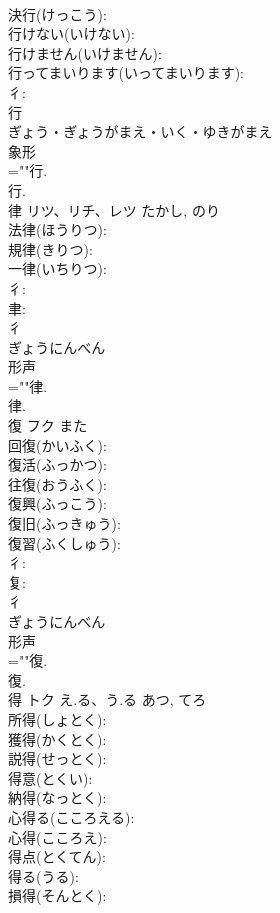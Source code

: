 \documentclass[8pt]{extreport}
\begin{document}
\begin{CJK}{UTF8}{min}
\\	決行(けっこう): 
\\	行けない(いけない): 
\\	行けません(いけません): 
\\	行ってまいります(いってまいります): 
\\	彳: 
\\	行	
\\	ぎょう・ぎょうがまえ・いく・ゆきがまえ	
\\	象形 
\\	=""行.
\\	行.
\\	律	リツ、リチ、レツ		たかし, のり	
\\	法律(ほうりつ): 
\\	規律(きりつ): 
\\	一律(いちりつ): 
\\	彳: 
\\	聿: 
\\	彳	
\\	ぎょうにんべん	
\\	形声 
\\	=""律.
\\	律.
\\	復	フク	また		
\\	回復(かいふく): 
\\	復活(ふっかつ): 
\\	往復(おうふく): 
\\	復興(ふっこう): 
\\	復旧(ふっきゅう): 
\\	復習(ふくしゅう): 
\\	彳: 
\\	复: 
\\	彳	
\\	ぎょうにんべん	
\\	形声 
\\	=""復.
\\	復.
\\	得	トク	え.る、う.る	あつ, てろ	
\\	所得(しょとく): 
\\	獲得(かくとく): 
\\	説得(せっとく): 
\\	得意(とくい): 
\\	納得(なっとく): 
\\	心得る(こころえる): 
\\	心得(こころえ): 
\\	得点(とくてん): 
\\	得る(うる): 
\\	損得(そんとく): 

\end{CJK}
\end{document}
